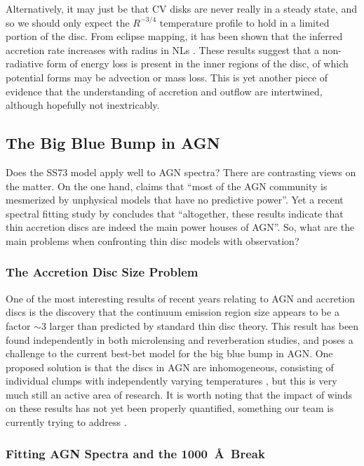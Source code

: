 Alternatively, it may just be that CV disks are never really in
a steady state, and so we should only expect the $R^{-3/4}$
temperature profile to hold in a limited portion of the disc.
From eclipse mapping, it has been shown that the inferred accretion
rate increases with radius in NLs \citep{rutten1992, horne1993}.
These results suggest that a non-radiative form of energy loss
is present in the inner regions of the disc, of which potential forms
may be advection or mass loss. This is yet another piece of evidence
that the understanding of accretion and outflow 
are intertwined, although hopefully not inextricably.

\subsection{The Big Blue Bump in AGN}

Does the SS73 model apply well to AGN spectra? There are contrasting views on the matter.
On the one hand, \cite{antonucci2013} claims that ``most of the AGN community is mesmerized by unphysical models that have no predictive power''. 
Yet a recent spectral fitting study by \cite{capellupo2015} concludes that 
``altogether, these results indicate that thin accretion discs are indeed the 
main power houses of AGN''. So, what are the main problems when 
confronting thin disc models with observation? 

\subsubsection{The Accretion Disc Size Problem}

One of the most interesting results of recent years relating to AGN and accretion discs is
the discovery that the continuum emission region size appears to be
a factor $\sim3$ larger than predicted by standard thin disc theory. This result
has been found independently in both microlensing \citep{morgan2010,dai2010} 
and reverberation \citep{edelson2015} studies, and poses a challenge to the 
current best-bet model for the big blue bump in AGN. 
One proposed solution is that the discs in AGN are inhomogeneous,
consisting of individual clumps with independently
varying temperatures \citep{dexteragol2011}, but this is very much
still an active area of research. It is worth noting that the impact
of winds on these results has not yet been properly quantified, something
our team is currently trying to address \citep{mangham}.

\subsubsection{Fitting AGN Spectra and the 1000~\AA\ Break}

